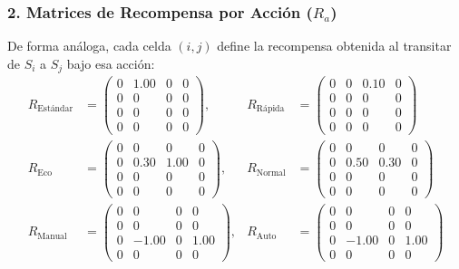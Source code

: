 \subsubsection*{2. Matrices de Recompensa por Acción ($R_a$)}
De forma análoga, cada celda $(i, j)$ define la recompensa obtenida al transitar de $S_i$ a $S_j$ bajo esa acción:
\begin{align*}
  R_{\text{Estándar}} &= \begin{pmatrix}
    0 & 1.00 & 0 & 0 \\
    0 & 0 & 0 & 0 \\
    0 & 0 & 0 & 0 \\
    0 & 0 & 0 & 0
  \end{pmatrix}, &
  R_{\text{Rápida}} &= \begin{pmatrix}
    0 & 0 & 0.10 & 0 \\
    0 & 0 & 0 & 0 \\
    0 & 0 & 0 & 0 \\
    0 & 0 & 0 & 0
  \end{pmatrix} \\[6pt]
  R_{\text{Eco}} &= \begin{pmatrix}
    0 & 0 & 0 & 0 \\
    0 & 0.30 & 1.00 & 0 \\
    0 & 0 & 0 & 0 \\
    0 & 0 & 0 & 0
  \end{pmatrix}, &
  R_{\text{Normal}} &= \begin{pmatrix}
    0 & 0 & 0 & 0 \\
    0 & 0.50 & 0.30 & 0 \\
    0 & 0 & 0 & 0 \\
    0 & 0 & 0 & 0
  \end{pmatrix} \\[6pt]
  R_{\text{Manual}} &= \begin{pmatrix}
    0 & 0 & 0 & 0 \\
    0 & 0 & 0 & 0 \\
    0 & -1.00 & 0 & 1.00 \\
    0 & 0 & 0 & 0
  \end{pmatrix}, &
  R_{\text{Auto}} &= \begin{pmatrix}
    0 & 0 & 0 & 0 \\
    0 & 0 & 0 & 0 \\
    0 & -1.00 & 0 & 1.00 \\
    0 & 0 & 0 & 0
  \end{pmatrix}
\end{align*}

